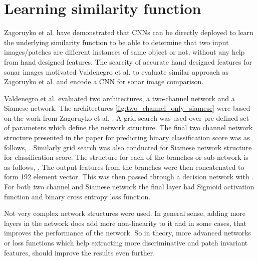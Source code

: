 \section{Learning similarity function}

Zagoruyko et al. have demonstrated that CNNs can be directly deployed to learn the underlying similarity function to be able to determine that two input images/patches are different instances of same object or not, 
without any help from hand designed features. The scarcity of accurate hand designed features for sonar images motivated Valdenegro et al. to evaluate similar approach as Zagoruyko et al. and encode a CNN for sonar image comparison.

Valdenegro et al. \cite{stateoftheart} evaluated two architectures, a two-channel network and a Siamese network. The architectures \ref{fig:two_channel_only_siamese} were based on the work from Zagoruyko et al. \cite{zagoruyko2015learning}.
A grid search was used over pre-defined set of parameters which define the network structure. The final two channel network structure presented in the paper for predicting binary classification score was as follows,
. Similarly grid search was also conducted for Siamese network structure for classification score. 
The structure for each 
of the branches or sub-network is as follows, . The output features from the branches were then concatenated to form 192 
element vector. This was then passed through a decision network with . For both two channel and Siamese network the final  layer had Sigmoid \cite{kerassigmoid} activation function and binary cross entropy loss 
\cite{kerascrossentropy} function. 

Not very complex network structures were used. In general sense, adding more layers in the network does add more non-linearity to it and in some cases, that improves the performance of the network. So in theory, more advanced networks or loss 
functions which help extracting more discriminative and patch invariant features, should improve the results even further.

